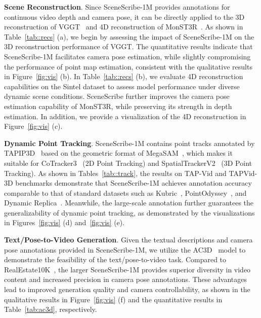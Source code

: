 \noindent\textbf{Scene Reconstruction}.
Since SceneScribe-1M provides annotations for continuous video depth and camera pose, it can be directly applied to the 3D reconstruction of VGGT~\cite{wang2025vggt} and 4D reconstruction of MonST3R~\cite{zhang2024monst3r}.
As shown in Table~\ref{tab::recs} (a), we begin by assessing the impact of SceneScribe-1M on the 3D reconstruction performance of VGGT. The quantitative results indicate that SceneScribe-1M facilitates camera pose estimation, while slightly compromising the performance of point map estimation, consistent with the qualitative results in Figure~\ref{fig:vis} (b).
In Table~\ref{tab::recs} (b), we evaluate 4D reconstruction capabilities on the Sintel dataset to assess model performance under diverse dynamic scene conditions. SceneScribe further improves the camera pose estimation capability of MonST3R, while preserving its strength in depth estimation. In addition,  we provide a visualization of the 4D reconstruction in Figure~\ref{fig:vis} (c).














\noindent\textbf{Dynamic Point Tracking}.
SceneScribe-1M contains point tracks annotated by TAPIP3D~\cite{zhang2025tapip3d} based on the geometric format of MegaSAM~\cite{li2025megasam}, which makes it suitable for CoTracker3~\cite{karaev2025cotracker3} (2D Point Tracking) and SpatialTrackerV2~\cite{xiao2025spatialtrackerv2} (3D Point Tracking).
As shown in Tables~\ref{tab::track}, the results on TAP-Vid and TAPVid-3D benchmarks demonstrate that SceneScribe-1M achieves annotation accuracy comparable to that of standard datasets such as Kubric~\cite{greff2022kubric}, PointOdyssey~\cite{zheng2023pointodyssey}, and Dynamic Replica~\cite{karaev2023dynamicstereo}.
Meanwhile, the large-scale annotation further guarantees the generalizability of dynamic point tracking, as demonstrated by the visualizations in Figures~\ref{fig:vis} (d) and~\ref{fig:vis} (e).



\noindent\textbf{Text/Pose-to-Video Generation}.
Given the textual descriptions and camera pose annotations provided in SceneScribe-1M, we utilize the AC3D~\cite{bahmani2025ac3d} model to demonstrate the feasibility of the text/pose-to-video task. Compared to RealEstate10K~\cite{zhou2018stereo}, the larger SceneScribe-1M provides superior diversity in video content and increased precision in camera pose annotations. These advantages lead to improved generation quality and camera controllability, as shown in the qualitative results in Figure~\ref{fig:vis} (f) and the quantitative results in Table~\ref{tab:ac3d}, respectively.






